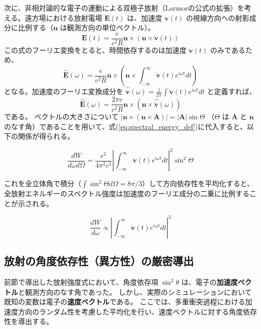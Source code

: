 \documentclass[a4paper,11pt]{bxjsarticle} %
\begin{document}
次に、非相対論的な電子の運動による双極子放射（Larmorの公式の拡張）を考える。遠方場における放射電場 $\bm{E}(t)$ は、加速度 $\dot{\bm{v}}(t)$ の視線方向への射影成分に比例する（$\bm{n}$ は観測方向の単位ベクトル）。
\begin{equation}
    \bm{E}(t) = \frac{e}{c^2 R} \bm{n} \times (\bm{n} \times \dot{\bm{v}}(t))
\end{equation}
この式のフーリエ変換をとると、時間依存するのは加速度 $\dot{\bm{v}}(t)$ のみであるため、
\begin{equation}
    \hat{\bm{E}}(\omega) = \frac{e}{c^2 R} \bm{n} \times \left( \bm{n} \times \int_{-\infty}^{\infty} \dot{\bm{v}}(t) e^{i\omega t} dt \right)
\end{equation}
となる。加速度のフーリエ変換成分を $\hat{\dot{\bm{v}}}(\omega) = \frac{1}{2\pi} \int \dot{\bm{v}}(t) e^{i\omega t} dt$ と定義すれば、
\begin{equation}
    \hat{\bm{E}}(\omega) = \frac{2\pi e}{c^2 R} \bm{n} \times (\bm{n} \times \hat{\dot{\bm{v}}}(\omega))
\end{equation}
である。
ベクトルの大きさについて $|\bm{n} \times (\bm{n} \times \bm{A})| = |\bm{A}| \sin\Theta$ （$\Theta$ は $\bm{A}$ と $\bm{n}$ のなす角）であることを用いて、式(\ref{eq:spectral_energy_def})に代入すると、以下の関係が得られる。

\begin{equation}
    \frac{dW}{d\omega d\Omega} = \frac{e^2}{4\pi^2 c^3} \left| \int_{-\infty}^{\infty} \dot{\bm{v}}(t) e^{i\omega t} dt \right|^2 \sin^2\Theta
\end{equation}

これを全立体角で積分（$\int \sin^2\Theta d\Omega = 8\pi/3$）して方向依存性を平均化すると、全放射エネルギーのスペクトル強度は加速度のフーリエ成分の二乗に比例することが示される。

\begin{equation}
    \frac{dW}{d\omega} \propto \left| \int_{-\infty}^{\infty} \dot{\bm{v}}(t) e^{i\omega t} dt \right|^2
\end{equation}


\subsection{放射の角度依存性（異方性）の厳密導出}

前節で導出した放射強度式において、角度依存項 $\sin^2\theta$ は、電子の\textbf{加速度ベクトル}と観測方向のなす角であった。
しかし、実際のシミュレーションにおいて既知の変数は電子の\textbf{速度ベクトル}である。
ここでは、多重衝突過程における加速度方向のランダム性を考慮した平均化を行い、速度ベクトルに対する角度依存性を導出する。
\end{document}
